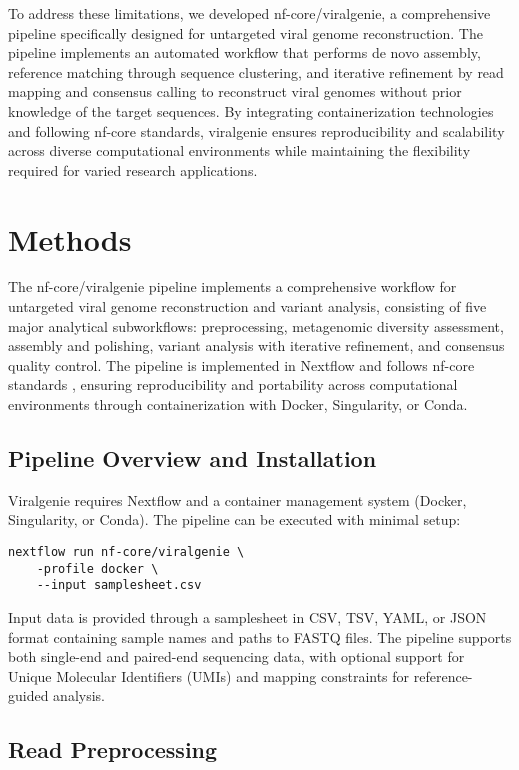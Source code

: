 \documentclass[unnumsec,webpdf,contemporary,large]{oup-authoring-template}%
\theoremstyle{thmstyleone}%
\theoremstyle{thmstyletwo}%
\theoremstyle{thmstylethree}%
\begin{document}
To address these limitations, we developed nf-core/viralgenie, a comprehensive pipeline specifically designed for untargeted viral genome reconstruction. The pipeline implements an automated workflow that performs de novo assembly, reference matching through sequence clustering, and iterative refinement by read mapping and consensus calling to reconstruct viral genomes without prior knowledge of the target sequences. By integrating containerization technologies and following nf-core standards, viralgenie ensures reproducibility and scalability across diverse computational environments while maintaining the flexibility required for varied research applications.

\section{Methods}\label{sec2}

The nf-core/viralgenie pipeline implements a comprehensive workflow for untargeted viral genome reconstruction and variant analysis, consisting of five major analytical subworkflows: preprocessing, metagenomic diversity assessment, assembly and polishing, variant analysis with iterative refinement, and consensus quality control. The pipeline is implemented in Nextflow and follows nf-core standards \cite{Krakau2022-qh}, ensuring reproducibility and portability across computational environments through containerization with Docker, Singularity, or Conda.

\subsection{Pipeline Overview and Installation}\label{subsec_overview}

Viralgenie requires Nextflow and a container management system (Docker, Singularity, or Conda). The pipeline can be executed with minimal setup:

\begin{verbatim}
nextflow run nf-core/viralgenie \
    -profile docker \
    --input samplesheet.csv
\end{verbatim}

Input data is provided through a samplesheet in CSV, TSV, YAML, or JSON format containing sample names and paths to FASTQ files. The pipeline supports both single-end and paired-end sequencing data, with optional support for Unique Molecular Identifiers (UMIs) and mapping constraints for reference-guided analysis.

\subsection{Read Preprocessing}\label{subsec_preprocessing}
\end{document}
